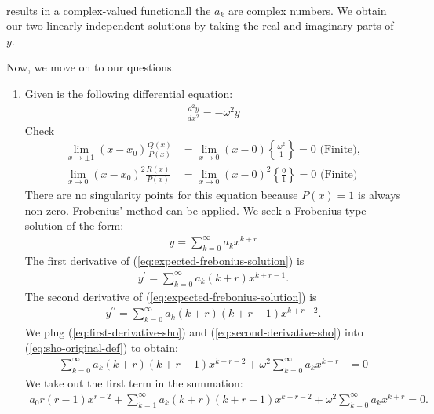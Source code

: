 \begin{enumerate}[label={(\arabic*)}]
\begin{enumerate}[label={(\roman*)}]
\begin{align}
        \end{align}
        results in a complex-valued function\textemdash all the $a_k$ are complex numbers. We obtain our two linearly independent solutions by taking the real and imaginary parts of $y$.
    \end{enumerate}
    \bigskip\bigskip\hline\hline\bigskip
    Now, we move on to our questions.
    \begin{enumerate}[label={(\alph*)}]
        \item Given is the following differential equation:
    \begin{align}
        \frac{d^2y}{dx^2}=-\omega^2y\label{eq:sho-original-def}
    \end{align}
    Check
    \begin{align}
        \lim_{x\to\pm1}\left(x-x_0\right)\frac{Q(x)}{P(x)} &= \lim_{x\to0}\left(x-0\right)\left\{\frac{\omega^2}{1}\right\}=0 \text{ (Finite)}, \\
        \lim_{x\to0}\left(x-x_0\right)^2\frac{R(x)}{P(x)} &= \lim_{x\to0}\left(x-0\right)^2\left\{\frac{0}{1}\right\}=0 \text{ (Finite)}
    \end{align}
    There are no singularity points for this equation because $P(x)=1$ is always non-zero. Frobenius' method can be applied. We seek a Frobenius-type solution of the form:
    \begin{align}
        y = \sum_{k=0}^{\infty} a_k x^{k+r} \label{eq:expected-frebonius-solution}
    \end{align}
    The first derivative of (\ref{eq:expected-frebonius-solution}) is
    \begin{align}
        y^{\prime} = \sum_{k=0}^{\infty} a_k (k+r) x^{k+r-1}.\label{eq:first-derivative-sho}
    \end{align}
    The second derivative of (\ref{eq:expected-frebonius-solution}) is
    \begin{align}
        y^{\prime\prime} = \sum_{k=0}^{\infty} a_k (k+r) (k+r-1) x^{k+r-2}.\label{eq:second-derivative-sho}
    \end{align}
    We plug (\ref{eq:first-derivative-sho}) and (\ref{eq:second-derivative-sho}) into (\ref{eq:sho-original-def}) to obtain:
    \begin{align}
        \sum_{k=0}^{\infty} a_k (k+r) (k+r-1) x^{k+r-2} + \omega^2 \sum_{k=0}^{\infty} a_k x^{k+r} &= 0
    \end{align}
    We take out the first term in the summation:
    \begin{align}
        a_0 r(r-1) x^{r-2} + \sum_{k=1}^\infty a_k (k+r)(k+r-1) x^{k+r-2} + \omega^2 \sum_{k=0}^{\infty} a_k x^{k+r}=0.

\end{align}
\end{enumerate}
\end{enumerate}
